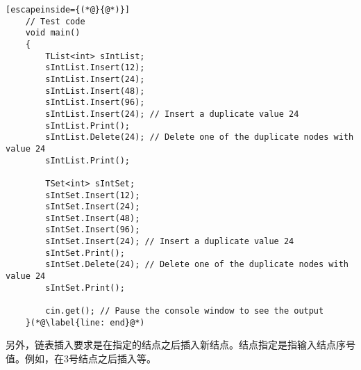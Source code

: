 \documentclass[10pt, a4paper, oneside, fontset=none]{ctexart}
\theoremstyle{plain}
\theoremstyle{definition}
\begin{document}
\begin{lstlisting}[escapeinside={(*@}{@*)}]
	// Test code
	void main()
	{
		TList<int> sIntList;
		sIntList.Insert(12);
		sIntList.Insert(24);
		sIntList.Insert(48);
		sIntList.Insert(96);
		sIntList.Insert(24); // Insert a duplicate value 24
		sIntList.Print();
		sIntList.Delete(24); // Delete one of the duplicate nodes with value 24
		sIntList.Print();
	
		TSet<int> sIntSet;
		sIntSet.Insert(12);
		sIntSet.Insert(24);
		sIntSet.Insert(48);
		sIntSet.Insert(96);
		sIntSet.Insert(24); // Insert a duplicate value 24
		sIntSet.Print();
		sIntSet.Delete(24); // Delete one of the duplicate nodes with value 24
		sIntSet.Print();
	
		cin.get(); // Pause the console window to see the output
	}(*@\label{line: end}@*)
\end{lstlisting}
另外，链表插入要求是在指定的结点之后插入新结点。结点指定是指输入结点序号值。例如，在3号结点之后插入等。
\subsection{}
\kai
\end{document}
